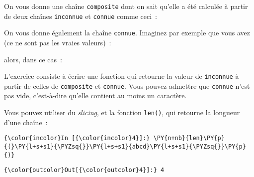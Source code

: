     On vous donne une chaîne \texttt{composite} dont on sait qu'elle a été
calculée à partir de deux chaînes \texttt{inconnue} et \texttt{connue}
comme ceci~:

\begin{Shaded}
\begin{Highlighting}[]
\OperatorTok{=}\OperatorTok{+}\OperatorTok{+}
\end{Highlighting}
\end{Shaded}

    On vous donne également la chaîne \texttt{connue}. Imaginez par exemple
que vous avez (ce ne sont pas les vraies valeurs)~:

\begin{Shaded}
\begin{Highlighting}[]
\OperatorTok{=} 
\OperatorTok{=} 
\end{Highlighting}
\end{Shaded}

alors, dans ce cas~:

\begin{Shaded}
\begin{Highlighting}[]
\OperatorTok{=} 
\end{Highlighting}
\end{Shaded}

    L'exercice consiste à écrire une fonction qui retourne la valeur de
\texttt{inconnue} à partir de celles de \texttt{composite} et
\texttt{connue}. Vous pouvez admettre que \texttt{connue} n'est pas
vide, c'est-à-dire qu'elle contient au moins un caractère.

    Vous pouvez utiliser du \emph{slicing}, et la fonction \texttt{len()},
qui retourne la longueur d'une chaîne~:

    \begin{Verbatim}[commandchars=\\\{\}]
{\color{incolor}In [{\color{incolor}4}]:} \PY{n+nb}{len}\PY{p}{(}\PY{l+s+s1}{\PYZsq{}}\PY{l+s+s1}{abcd}\PY{l+s+s1}{\PYZsq{}}\PY{p}{)}
\end{Verbatim}


\begin{Verbatim}[commandchars=\\\{\}]
{\color{outcolor}Out[{\color{outcolor}4}]:} 4
\end{Verbatim}
            
